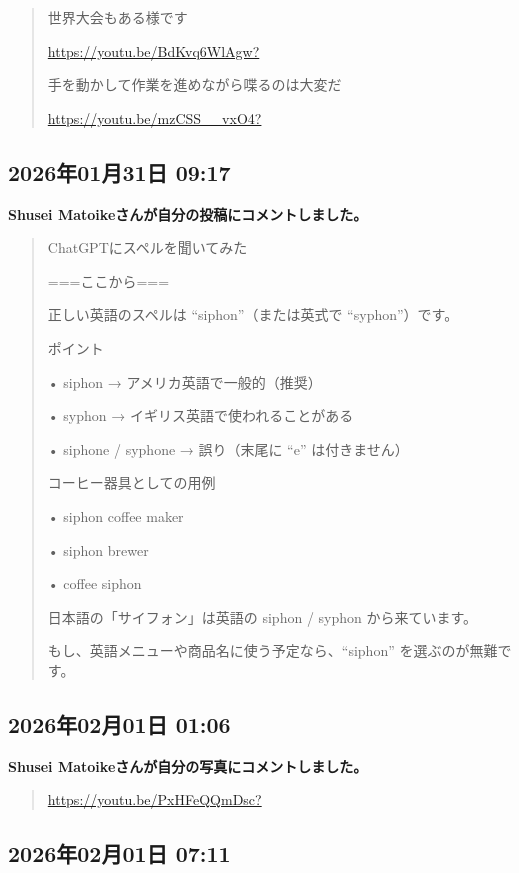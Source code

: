 \begin{quote}
世界大会もある様です

\url{https://youtu.be/BdKvq6WlAgw?}

手を動かして作業を進めながら喋るのは大変だ

\url{https://youtu.be/mzCSS__vxO4?}
\end{quote}

\subsection*{2026年01月31日 09:17}

\textbf{Shusei Matoikeさんが自分の投稿にコメントしました。}

\begin{quote}
ChatGPTにスペルを聞いてみた

===ここから===

正しい英語のスペルは “siphon”（または英式で “syphon”）です。

ポイント

• siphon → アメリカ英語で一般的（推奨）

• syphon → イギリス英語で使われることがある

• siphone / syphone → 誤り（末尾に “e” は付きません）

コーヒー器具としての用例

• siphon coffee maker

• siphon brewer

• coffee siphon

日本語の「サイフォン」は英語の siphon / syphon から来ています。

もし、英語メニューや商品名に使う予定なら、“siphon” を選ぶのが無難です。
\end{quote}

\subsection*{2026年02月01日 01:06}

\textbf{Shusei Matoikeさんが自分の写真にコメントしました。}

\begin{quote}
\url{https://youtu.be/PxHFeQQmDsc?}
\end{quote}

\subsection*{2026年02月01日 07:11}

